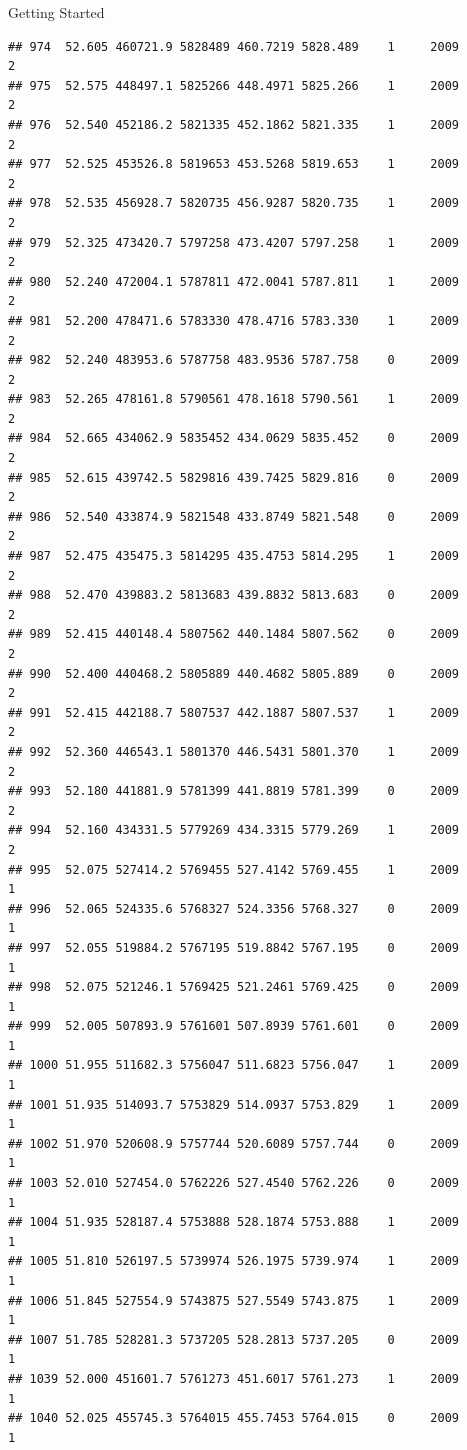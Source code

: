 \documentclass[
  ignorenonframetext,
]{beamer}
\begin{document}
\begin{frame}[fragile]{Getting Started}
\begin{verbatim}
## 974  52.605 460721.9 5828489 460.7219 5828.489    1     2009        2
## 975  52.575 448497.1 5825266 448.4971 5825.266    1     2009        2
## 976  52.540 452186.2 5821335 452.1862 5821.335    1     2009        2
## 977  52.525 453526.8 5819653 453.5268 5819.653    1     2009        2
## 978  52.535 456928.7 5820735 456.9287 5820.735    1     2009        2
## 979  52.325 473420.7 5797258 473.4207 5797.258    1     2009        2
## 980  52.240 472004.1 5787811 472.0041 5787.811    1     2009        2
## 981  52.200 478471.6 5783330 478.4716 5783.330    1     2009        2
## 982  52.240 483953.6 5787758 483.9536 5787.758    0     2009        2
## 983  52.265 478161.8 5790561 478.1618 5790.561    1     2009        2
## 984  52.665 434062.9 5835452 434.0629 5835.452    0     2009        2
## 985  52.615 439742.5 5829816 439.7425 5829.816    0     2009        2
## 986  52.540 433874.9 5821548 433.8749 5821.548    0     2009        2
## 987  52.475 435475.3 5814295 435.4753 5814.295    1     2009        2
## 988  52.470 439883.2 5813683 439.8832 5813.683    0     2009        2
## 989  52.415 440148.4 5807562 440.1484 5807.562    0     2009        2
## 990  52.400 440468.2 5805889 440.4682 5805.889    0     2009        2
## 991  52.415 442188.7 5807537 442.1887 5807.537    1     2009        2
## 992  52.360 446543.1 5801370 446.5431 5801.370    1     2009        2
## 993  52.180 441881.9 5781399 441.8819 5781.399    0     2009        2
## 994  52.160 434331.5 5779269 434.3315 5779.269    1     2009        2
## 995  52.075 527414.2 5769455 527.4142 5769.455    1     2009        1
## 996  52.065 524335.6 5768327 524.3356 5768.327    0     2009        1
## 997  52.055 519884.2 5767195 519.8842 5767.195    0     2009        1
## 998  52.075 521246.1 5769425 521.2461 5769.425    0     2009        1
## 999  52.005 507893.9 5761601 507.8939 5761.601    0     2009        1
## 1000 51.955 511682.3 5756047 511.6823 5756.047    1     2009        1
## 1001 51.935 514093.7 5753829 514.0937 5753.829    1     2009        1
## 1002 51.970 520608.9 5757744 520.6089 5757.744    0     2009        1
## 1003 52.010 527454.0 5762226 527.4540 5762.226    0     2009        1
## 1004 51.935 528187.4 5753888 528.1874 5753.888    1     2009        1
## 1005 51.810 526197.5 5739974 526.1975 5739.974    1     2009        1
## 1006 51.845 527554.9 5743875 527.5549 5743.875    1     2009        1
## 1007 51.785 528281.3 5737205 528.2813 5737.205    0     2009        1
## 1039 52.000 451601.7 5761273 451.6017 5761.273    1     2009        1
## 1040 52.025 455745.3 5764015 455.7453 5764.015    0     2009        1

\end{verbatim}
\end{frame}
\end{document}
